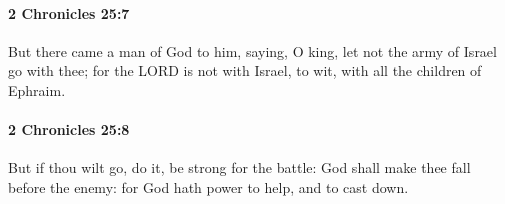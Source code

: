		\paragraph{2 Chronicles 25:7} %
			\label{2CHRONICLES-25-7}

			But there came a man of God to him, saying, O king, let not the army of Israel go with thee; for the LORD is not with Israel, to wit, with all the children of Ephraim.


		\paragraph{2 Chronicles 25:8} %
			\label{2CHRONICLES-25-8}

			But if thou wilt go, do it, be strong for the battle: God shall make thee fall before the enemy: for God hath power to help, and to cast down.


